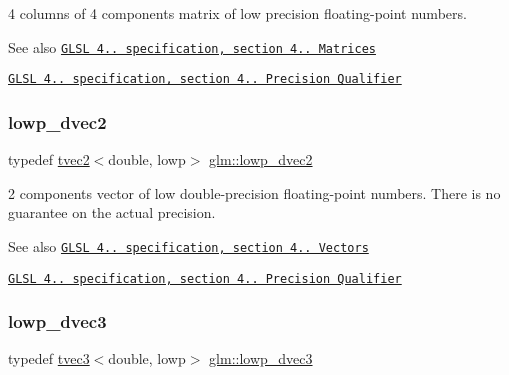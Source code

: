 4 columns of 4 components matrix of low precision floating-\/point numbers.

\begin{DoxySeeAlso}{See also}
\href{http://www.opengl.org/registry/doc/GLSLangSpec.4.20.8.pdf}{\tt G\+L\+SL 4.. specification, section 4.. Matrices} 

\href{http://www.opengl.org/registry/doc/GLSLangSpec.4.20.8.pdf}{\tt G\+L\+SL 4.. specification, section 4.. Precision Qualifier} 
\end{DoxySeeAlso}
\mbox{\label{group__core__precision_ga26ff2843d850f4f6ad591540e1ff1818}} 
\subsubsection{\texorpdfstring{lowp\+\_\+dvec2}{lowp\_dvec2}}
{\footnotesize\ttfamily typedef \hyperlink{structglm_1_1tvec2}{tvec2}$<$double, lowp$>$ \hyperlink{group__core__precision_ga26ff2843d850f4f6ad591540e1ff1818}{glm\+::lowp\+\_\+dvec2}}

2 components vector of low double-\/precision floating-\/point numbers. There is no guarantee on the actual precision.

\begin{DoxySeeAlso}{See also}
\href{http://www.opengl.org/registry/doc/GLSLangSpec.4.20.8.pdf}{\tt G\+L\+SL 4.. specification, section 4.. Vectors} 

\href{http://www.opengl.org/registry/doc/GLSLangSpec.4.20.8.pdf}{\tt G\+L\+SL 4.. specification, section 4.. Precision Qualifier} 
\end{DoxySeeAlso}
\mbox{\label{group__core__precision_ga88d318815a9af448bddcb16fceb155c5}} 
\subsubsection{\texorpdfstring{lowp\+\_\+dvec3}{lowp\_dvec3}}
{\footnotesize\ttfamily typedef \hyperlink{structglm_1_1tvec3}{tvec3}$<$double, lowp$>$ \hyperlink{group__core__precision_ga88d318815a9af448bddcb16fceb155c5}{glm\+::lowp\+\_\+dvec3}}

